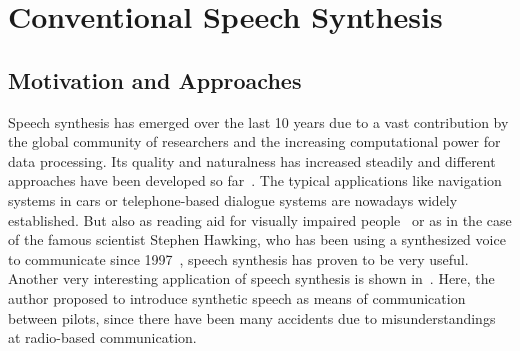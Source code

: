 

\section{Conventional Speech Synthesis}
\label{sec:speech}

\subsection{Motivation and Approaches}
\label{subsec:convenspeech}

Speech synthesis has emerged over the last 10 years due to a vast contribution by the global community of researchers and the increasing computational power for data processing. Its quality and naturalness has increased steadily and different approaches have been developed so far~\cite{suendermann:challenges}. The typical applications like navigation systems in cars or telephone-based dialogue systems are nowadays widely established. But also as reading aid for visually impaired people~\cite{readspeaker:tts} or as in the case of the famous scientist Stephen Hawking, who has been using a synthesized voice to communicate since 1997~\cite{hawking:speech}, speech synthesis has proven to be very useful. Another very interesting application of speech synthesis is shown in~\cite{dhavala:communication}. Here, the author proposed to introduce synthetic speech as means of communication between pilots, since there have been many accidents due to misunderstandings at radio-based communication. %


